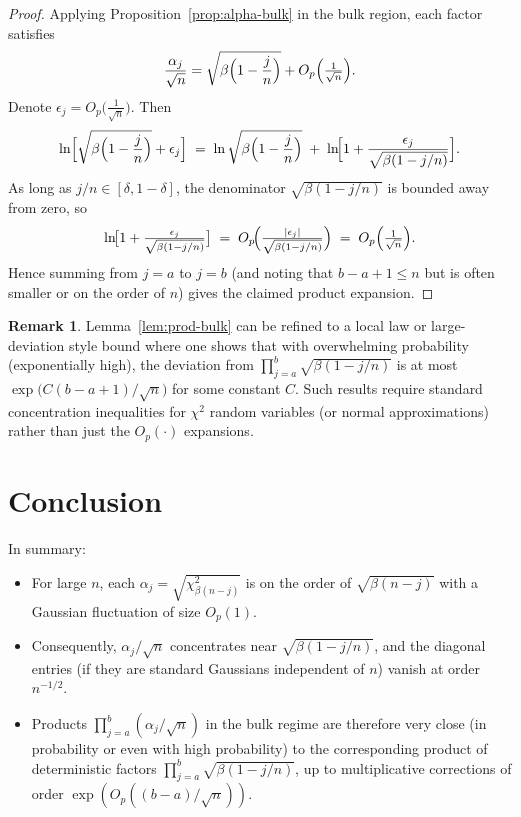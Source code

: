\documentclass[letterpaper,11pt,oneside,reqno]{article}
\numberwithin{equation}{section}
\theoremstyle{definition}
\newtheorem{remark}[proposition]{Remark}
\begin{document}
\begin{proof}
Applying Proposition~\ref{prop:alpha-bulk} in the bulk region, each factor satisfies
\[
  \frac{\alpha_j}{\sqrt{n}}
  =
  \sqrt{\beta\Bigl(1 - \frac{j}{n}\Bigr)} + O_p\Bigl(\tfrac{1}{\sqrt{n}}\Bigr).
\]
Denote $\epsilon_j = O_p\bigl(\tfrac{1}{\sqrt{n}}\bigr)$.  Then
\[
  \ln\Bigl[\sqrt{\beta\Bigl(1 - \frac{j}{n}\Bigr)} + \epsilon_j\Bigr]
  \;=\;
  \ln\sqrt{\beta\Bigl(1 - \frac{j}{n}\Bigr)}
    \;+\; \ln\!\Bigl[1 + \frac{\epsilon_j}{\sqrt{\beta(1-j/n)}}\Bigr].
\]
As long as $j/n \in [\delta, 1-\delta]$, the denominator $\sqrt{\beta(1-j/n)}$ is bounded away from zero, so
\[
  \ln\!\bigl[1 + \tfrac{\epsilon_j}{\sqrt{\beta(1-j/n)}}\bigr]
  \;=\;
  O_p\!\Bigl(\tfrac{|\epsilon_j|}{\sqrt{\beta(1-j/n)}}\Bigr)
  \;=\;
  O_p\Bigl(\tfrac{1}{\sqrt{n}}\Bigr).
\]
Hence summing from $j=a$ to $j=b$ (and noting that $b-a+1 \le n$ but is often smaller or on the order of $n$) gives the claimed product expansion.
\end{proof}

\begin{remark}
	Lemma~\ref{lem:prod-bulk} can be refined to a local law or large-deviation style bound where one shows that with overwhelming probability (exponentially high), the deviation from $\prod_{j=a}^b \sqrt{\beta(1-j/n)}$ is at most $\exp\bigl(C(b-a+1)/\sqrt{n}\bigr)$ for some constant $C$.  Such results require standard concentration inequalities for $\chi^2$ random variables (or normal approximations) rather than just the $O_p(\cdot)$ expansions.
\end{remark}

\section{Conclusion}

In summary:

\begin{itemize}
\item For large $n$, each $\alpha_j = \sqrt{\chi^2_{\beta(n-j)}}$
is on the order of $\sqrt{\beta(n-j)}$ with a Gaussian fluctuation of size $O_p(1)$.
\item Consequently, $\alpha_j/\sqrt{n}$ concentrates near $\sqrt{\beta(1-j/n)}$,
and the diagonal entries (if they are standard Gaussians independent of $n$)
vanish at order $n^{-1/2}$.
\item Products $\prod_{j=a}^b (\alpha_j/\sqrt{n})$ in the bulk regime
are therefore very close (in probability or even with high probability)
to the corresponding product of deterministic factors $\prod_{j=a}^b \sqrt{\beta(1-j/n)}$,
up to multiplicative corrections of order $\exp(O_p((b-a)/\sqrt{n}))$.
\end{itemize}
\end{document}
